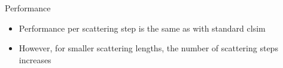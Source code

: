 
\begin{frame}[fragile]{Performance}
  \begin{itemize}
    \item Performance per scattering step is the same as with standard clsim
    \item However, for smaller scattering lengths, the number of scattering steps increases
    \follows {}
  \end{itemize}

\end{frame}